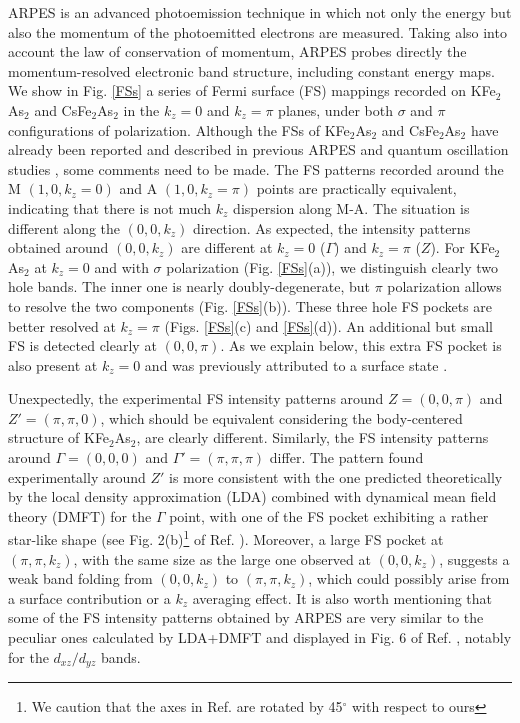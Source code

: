\documentclass[twocolumn,aps,showpacs,preprintnumbers,amsmath,amssymb, superscriptaddress,longbibliography]{revtex4-1}
\begin{document}
ARPES is an advanced photoemission technique in which not only the energy but also the momentum of the photoemitted electrons are measured. Taking also into account the law of conservation of momentum, ARPES probes directly the momentum-resolved electronic band structure, including constant energy maps. We show in Fig. \ref{FSs} a series of Fermi surface (FS) mappings recorded on KFe$_2$As$_2$ and CsFe$_2$As$_2$ in the $k_z=0$ and $k_z=\pi$ planes, under both $\sigma$ and $\pi$ configurations of polarization. Although the FSs of KFe$_2$As$_2$ and CsFe$_2$As$_2$ have already been reported and described in previous ARPES  \cite{Sato_PRL2009,Yoshida_JCPS72,Yoshida_FP2,Okazaki_Science337,Kong_PRB92} and quantum oscillation studies \cite{Terashima_JPSJ79,Terashima_PRB87,JPSConf2014_Zocco,Terashima_PRB89}, some comments need to be made. The FS patterns recorded around the M $(1,0,k_z=0)$ and A $(1,0,k_z=\pi)$ points are practically equivalent, indicating that there is not much $k_z$ dispersion along M-A. The situation is different along the $(0,0,k_z)$ direction. As expected, the intensity patterns obtained around $(0,0,k_z)$ are different at $k_z=0$ ($\Gamma$) and $k_z=\pi$ ($Z$). For KFe$_2$As$_2$ at $k_z=0$ and with $\sigma$ polarization (Fig. \ref{FSs}(a)), we distinguish clearly two hole bands. The inner one is nearly doubly-degenerate, but $\pi$ polarization allows to resolve the two components (Fig. \ref{FSs}(b)). These three hole FS pockets are better resolved at $k_z=\pi$ (Figs. \ref{FSs}(c) and \ref{FSs}(d)). An additional but small FS is detected clearly  at $(0,0,\pi)$. As we explain below, this extra FS pocket is also present at $k_z=0$ and was previously attributed to a surface state \cite{Yoshida_JCPS72,Yoshida_FP2}. 

Unexpectedly, the experimental FS intensity patterns around $Z=(0,0,\pi)$ and $Z'=(\pi,\pi,0)$, which should be equivalent considering the body-centered structure of KFe$_2$As$_2$, are clearly different. Similarly, the FS intensity patterns around $\Gamma=(0,0,0)$ and $\Gamma'=(\pi,\pi,\pi)$ differ. The pattern found experimentally around $Z'$ is more consistent with the one predicted theoretically by the local density approximation (LDA) combined with dynamical mean field theory (DMFT) for the $\Gamma$ point, with one of the FS pocket exhibiting a rather star-like shape (see Fig. 2(b)\footnote{We caution that the axes in Ref. \cite{Backes_NJP16} are rotated by 45$^{\circ}$ with respect to ours} of Ref. \cite{Backes_NJP16}). Moreover, a large FS pocket at $(\pi,\pi,k_z)$, with the same size as the large one observed at $(0,0,k_z)$, suggests a weak band folding from $(0,0,k_z)$ to $(\pi,\pi,k_z)$, which could possibly arise from a surface contribution or a $k_z$ averaging effect. It is also worth mentioning that some of the FS intensity patterns obtained by ARPES are very similar to the peculiar ones calculated by LDA+DMFT and displayed in Fig. 6 of Ref. \cite{Backes_NJP16}, notably for the $d_{xz}/d_{yz}$ bands.
\end{document}
